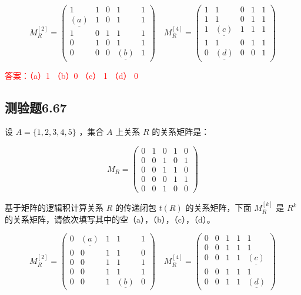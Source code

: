 \documentclass[UTF8, heading=true]{ctexart}
\begin{document}
$$
M_R^{[2]}=\left(\begin{array}{ccccc}
1 & 1 & 0 & 1 & 1 \\
\underline{(a)} & 1 & 0 & 1 & 1 \\
1 & 0 & 1 & 1 & 1 \\
0 & 1 & 0 & 1 & 1 \\
0 & 0 & 0 & \underline{(b)} & 1
\end{array}\right) \quad M_R^{[4]}=\left(\begin{array}{ccccc}
1 & 1 & 0 & 1 & 1 \\
1 & 1 & 0 & 1 & 1 \\
1 & \underline{(c)} & 1 & 1 & 1 \\
1 & 1 & 0 & 1 & 1 \\
0 & \underline{(d)} & 0 & 0 & 1
\end{array}\right)
$$


\textcolor{red}{答案：（a）1 （b）0 （c） 1 （d） 0}

\subsection{测验题6.67}

设 $A=\{1,2,3,4,5\}$ ，集合 $A$ 上关系 $R$ 的关系矩阵是：

$$
M_R=\left(\begin{array}{lllll}
0 & 1 & 0 & 1 & 0 \\
0 & 0 & 1 & 0 & 1 \\
0 & 0 & 1 & 1 & 0 \\
0 & 0 & 0 & 1 & 1 \\
0 & 0 & 1 & 0 & 0
\end{array}\right)
$$

基于矩阵的逻辑积计算关系 $R$ 的传递闭包 $t(R)$ 的关系矩阵，下面 $M_R^{[k]}$ 是 $R^k$ 的关系矩阵，请依次填写其中的空（a），（b），（c），（d）。

$$
M_R^{[2]}=\left(\begin{array}{ccccc}
0 & \underline{(a)} & 1 & 1 & 1 \\
0 & 0 & 1 & 1 & 0 \\
0 & 0 & 1 & 1 & 1 \\
0 & 0 & 1 & 1 & 1 \\
0 & 0 & 1 & \underline{(b)} & 0
\end{array}\right) \quad M_R^{[4]}=\left(\begin{array}{ccccc}
0 & 0 & 1 & 1 & 1 \\
0 & 0 & 1 & 1 & 1 \\
0 & 0 & 1 & 1 & \underline{(c)} \\
0 & 0 & 1 & 1 & 1 \\
0 & 0 & 1 & 1 & \underline{(d)}
\end{array}\right)
$$
\end{document}
